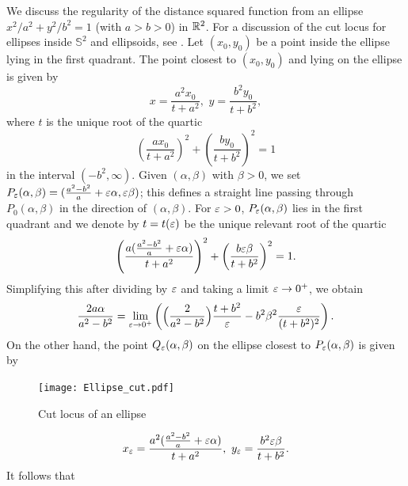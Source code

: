 \vspace{0.3cm}
\begin{eg}\label{eg:CutLocusOfEllipse-2}
    We discuss the regularity of the distance squared function from an ellipse $x^2/a^2+y^2/b^2=1$ (with $a>b>0$) in $\mathbb{R}^2$. For a discussion of the cut locus for ellipses inside $\mathbb{S}^2$ and ellipsoids, see \cite[pages 90-91]{Heb95}. Let $(x_0,y_0)$ be a point inside the ellipse lying in the first quadrant. The point closest to $(x_0,y_0)$ and lying on the ellipse is given by 
    \begin{displaymath}
        x=\frac{a^2x_0}{t+a^2},\,\,y=\frac{b^2y_0}{t+b^2},
    \end{displaymath}
    where $t$ is the unique root of the quartic
    \begin{displaymath}
        \left(\frac{ax_0}{t+a^2}\right)^2+\left(\frac{by_0}{t+b^2}\right)^2=1
    \end{displaymath}
    in the interval $(-b^2,\infty)$. Given $(\alpha,\beta)$ with $\beta>0$, we set $P_\varepsilon(\alpha,\beta)=(\frac{a^2-b^2}{a}+\varepsilon\alpha,\varepsilon\beta)$; this defines a straight line passing through $P_0(\alpha,\beta)$ in the direction of $(\alpha,\beta)$. For $\varepsilon>0$, $P_\varepsilon(\alpha,\beta)$ lies in the first quadrant and we denote by $t=t(\varepsilon)$ be the unique relevant root of the quartic
    \begin{displaymath}
        \left(\frac{a(\frac{a^2-b^2}{a}+\varepsilon\alpha)}{t+a^2}\right)^2+\left(\frac{b\varepsilon\beta}{t+b^2}\right)^2=1.
    \end{displaymath}
    Simplifying this after dividing by $\varepsilon$ and taking a limit $\varepsilon\to 0^+$, we obtain
    \begin{displaymath}
        \frac{2a\alpha}{a^2-b^2}=\lim_{\varepsilon\to 0^+}\left(\Big(\frac{2}{a^2-b^2}\Big)\frac{t+b^2}{\varepsilon}-b^2\beta^2 \frac{\varepsilon}{(t+b^2)^2}\right).
    \end{displaymath}
    On the other hand, the point $Q_\varepsilon(\alpha,\beta)$ on the ellipse closest to $P_\varepsilon(\alpha,\beta)$ is given by
    \begin{figure}[!htpb]
        \centering
        \texttt{[image: Ellipse\_cut.pdf]}
        \caption{Cut locus of an ellipse}
    \end{figure}
    \begin{displaymath}
        x_\varepsilon=\frac{a^2(\frac{a^2-b^2}{a}+\varepsilon\alpha)}{t+a^2},\,\,y_\varepsilon=\frac{b^2 \varepsilon\beta}{t+b^2}.
    \end{displaymath}
    It follows that
    \begin{equation}

\end{equation}
\end{eg}
